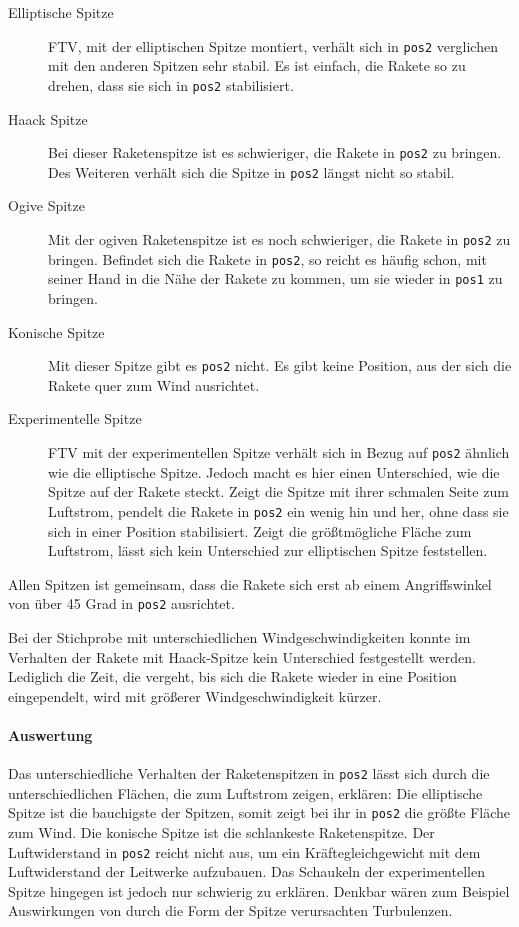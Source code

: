 \documentclass[10pt,a4paper]{article}
\begin{document}
\begin{description}
	\item[Elliptische Spitze] FTV, mit der elliptischen Spitze montiert, verhält sich in \texttt{pos2} verglichen mit den anderen Spitzen sehr stabil. Es ist einfach, die Rakete so zu drehen, dass sie sich in \texttt{pos2} stabilisiert.
	
	\item[Haack Spitze] Bei dieser Raketenspitze ist es schwieriger, die Rakete in \texttt{pos2} zu bringen. Des Weiteren verhält sich die Spitze in \texttt{pos2} längst nicht so stabil. 
	
	\item[Ogive Spitze] Mit der ogiven Raketenspitze ist es noch schwieriger, die Rakete in \texttt{pos2} zu bringen. Befindet sich die Rakete in \texttt{pos2}, so reicht es häufig schon, mit seiner Hand in die Nähe der Rakete zu kommen, um sie wieder in \texttt{pos1} zu bringen.
	
	\item[Konische Spitze] Mit dieser Spitze gibt es \texttt{pos2} nicht. Es gibt keine Position, aus der sich die Rakete quer zum Wind ausrichtet.
	
	\item[Experimentelle Spitze] FTV mit der experimentellen Spitze verhält sich in Bezug auf \texttt{pos2} ähnlich wie die elliptische Spitze. Jedoch macht es hier einen Unterschied, wie die Spitze auf der Rakete steckt. Zeigt die Spitze mit ihrer schmalen Seite zum Luftstrom, pendelt die Rakete in \texttt{pos2} ein wenig hin und her, ohne dass sie sich in einer Position stabilisiert.
	Zeigt die größtmögliche Fläche zum Luftstrom, lässt sich kein Unterschied zur elliptischen Spitze feststellen.	
\end{description}

\noindent
Allen Spitzen ist gemeinsam, dass die Rakete sich erst ab einem Angriffswinkel von über 45 Grad in \texttt{pos2} ausrichtet.

Bei der Stichprobe mit unterschiedlichen Windgeschwindigkeiten konnte im Verhalten der Rakete mit Haack-Spitze kein Unterschied festgestellt werden. Lediglich die Zeit, die vergeht, bis sich die Rakete wieder in eine Position eingependelt, wird mit größerer Windgeschwindigkeit kürzer.

\paragraph{Auswertung}
Das unterschiedliche Verhalten der Raketenspitzen in \texttt{pos2} lässt sich durch die unterschiedlichen Flächen, die zum Luftstrom zeigen, erklären: Die elliptische Spitze ist die bauchigste der Spitzen, somit zeigt bei ihr in \texttt{pos2} die größte Fläche zum Wind. 
Die konische Spitze ist die schlankeste Raketenspitze. Der Luftwiderstand in \texttt{pos2} reicht nicht aus, um ein Kräftegleichgewicht mit dem Luftwiderstand der Leitwerke aufzubauen.
Das Schaukeln der experimentellen Spitze hingegen ist jedoch nur schwierig zu erklären. Denkbar wären zum Beispiel Auswirkungen von durch die Form der Spitze verursachten Turbulenzen.
\end{document}
